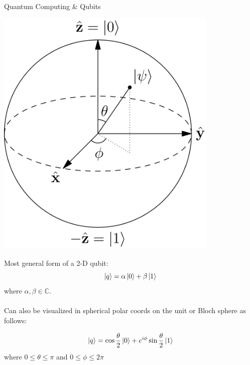 \documentclass[10pt]{beamer}
\begin{document}
{
\begin{frame}[fragile]{Quantum Computing \& Qubits}

\begin{minipage}[c]{.5\textwidth}
		\hspace{2mm}
       \includegraphics[width=0.8\textwidth]{blochsphere.png}
       \captionsetup{justification=raggedright, singlelinecheck=false}
\end{minipage}%
\begin{minipage}[c][][b]{.5\textwidth}
Most general form of a 2-D qubit:
\begin{equation}
\label{equ: blochqubit}
\ket{q} = \alpha \ket{0} + \beta \ket{1}
\end{equation}
where $\alpha,\beta \in \mathbb{C}$.\\
\\
Can also be visualized in spherical polar coords on the unit or Bloch sphere as follows: 

\begin{equation}
\label{equ: blochqubit}
\ket{q} = \cos\frac{\theta}{2} \ket{0} + e^{i \phi} \sin\frac{\theta}{2} \ket{1}
\end{equation}
where $0 \leq \theta \leq \pi$ and $0 \leq \phi \leq 2\pi$
\null
\par\xdef\tpd{\the\prevdepth}
\end{minipage}


\end{frame}
}
\end{document}
